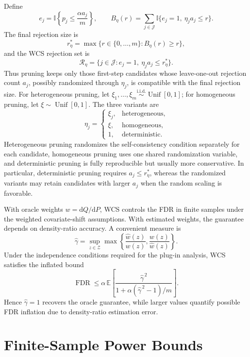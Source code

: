 Define
\[
    e_j
    =
    \mathbb{I}\!\left\{
        p_j\le \frac{\alpha a_j}{m}
    \right\},
    \qquad
    B_\eta(r)
    =
    \sum_{j\in\mathcal{J}}
    \mathbb{I}\{e_j=1,\ \eta_j a_j\le r\}.
\]
The final rejection size is
\[
    r_\eta^*
    =
    \max\{r\in\{0,\ldots,m\}:B_\eta(r)\ge r\},
\]
and the WCS rejection set is
\[
    \mathcal{R}_\eta
    =
    \{j\in\mathcal{J}:e_j=1,\ \eta_j a_j\le r_\eta^*\}.
\]
Thus pruning keeps only those first-step candidates whose leave-one-out
rejection count \(a_j\), possibly randomized through \(\eta_j\), is compatible
with the final rejection size. For heterogeneous pruning, let
\(\xi_1,\ldots,\xi_m\stackrel{\mathrm{i.i.d.}}{\sim}\operatorname{Unif}[0,1]\);
for homogeneous pruning, let \(\xi\sim\operatorname{Unif}[0,1]\). The three
variants are
\[
    \eta_j=
    \begin{cases}
        \xi_j, & \text{heterogeneous},\\
        \xi,   & \text{homogeneous},\\
        1,     & \text{deterministic}.
    \end{cases}
\]
Heterogeneous pruning randomizes the self-consistency condition separately
for each candidate, homogeneous pruning uses one shared randomization
variable, and deterministic pruning is fully reproducible but usually more
conservative. In particular, deterministic pruning requires
\(a_j\le r_\eta^*\), whereas the randomized variants may retain candidates
with larger \(a_j\) when the random scaling is favorable.

With oracle weights \(w=\mathrm{d}Q/\mathrm{d}P\), WCS controls the FDR in
finite samples under the weighted covariate-shift assumptions. With estimated
weights, the guarantee depends on density-ratio accuracy. A convenient measure
is
\[
    \widehat{\gamma}
    =
    \sup_{z\in\mathcal{Z}}
    \max\left\{
        \frac{\widehat w(z)}{w(z)},
        \frac{w(z)}{\widehat w(z)}
    \right\}.
\]
Under the independence conditions required for the plug-in analysis, WCS
satisfies the inflated bound
\[
    \operatorname{FDR}
    \le
    \alpha\,
    \mathbb{E}\!\left[
        \frac{\widehat{\gamma}^{\,2}}
        {1+\alpha(\widehat{\gamma}^{\,2}-1)/m}
    \right].
\]
Hence \(\widehat{\gamma}=1\) recovers the oracle guarantee, while larger
values quantify possible FDR inflation due to density-ratio estimation error.

\section{Finite-Sample Power Bounds}
\label{sec:constraints}

